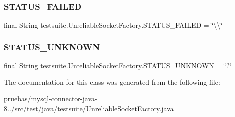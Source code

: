\subsubsection{\texorpdfstring{S\+T\+A\+T\+U\+S\+\_\+\+F\+A\+I\+L\+ED}{STATUS\_FAILED}}
{\footnotesize\ttfamily final String testsuite.\+Unreliable\+Socket\+Factory.\+S\+T\+A\+T\+U\+S\+\_\+\+F\+A\+I\+L\+ED = \char`\"{}\textbackslash{}\textbackslash{}\char`\"{}\hspace{0.3cm}{\ttfamily [static]}}

\mbox{\label{classtestsuite_1_1_unreliable_socket_factory_ab3f9a10e0c6fb5b7b50961c354cb168e}} 
\subsubsection{\texorpdfstring{S\+T\+A\+T\+U\+S\+\_\+\+U\+N\+K\+N\+O\+WN}{STATUS\_UNKNOWN}}
{\footnotesize\ttfamily final String testsuite.\+Unreliable\+Socket\+Factory.\+S\+T\+A\+T\+U\+S\+\_\+\+U\+N\+K\+N\+O\+WN = \char`\"{}?\char`\"{}\hspace{0.3cm}{\ttfamily [static]}}



The documentation for this class was generated from the following file\+:\begin{DoxyCompactItemize}
\item 
pruebas/mysql-\/connector-\/java-\/8../src/test/java/testsuite/\mbox{\hyperlink{_unreliable_socket_factory_8java}{Unreliable\+Socket\+Factory.\+java}}\end{DoxyCompactItemize}
